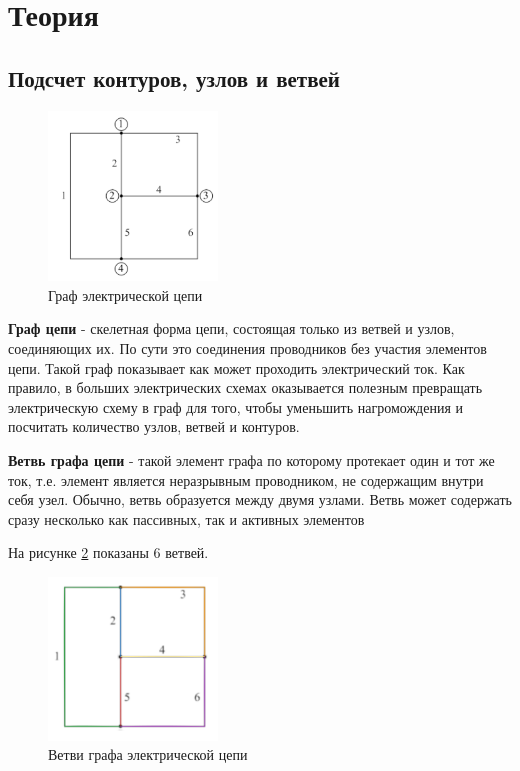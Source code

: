 \section{Теория}
\subsection{Подсчет контуров, узлов  и ветвей}
\begin{figure}[H]
    \centering
    \includegraphics[width=0.4\textwidth]{images/image_1_contures_nodes_branches.png}
    \caption{Граф электрической цепи}
    \label{fig:graph}
\end{figure}

\textbf{Граф цепи} - скелетная форма цепи, состоящая только из ветвей и узлов, соединяющих их. По сути это соединения проводников без участия элементов цепи. Такой граф показывает как может проходить электрический ток. Как правило, в больших электрических схемах оказывается полезным превращать электрическую схему в граф для того, чтобы уменьшить нагромождения и посчитать количество узлов, ветвей и контуров.

\textbf{Ветвь графа цепи} - такой элемент графа по которому протекает один и тот же ток, т.е. элемент является неразрывным проводником, не содержащим внутри себя узел. Обычно, ветвь образуется между двумя узлами. Ветвь может содержать сразу несколько как пассивных, так и активных элементов

На рисунке \ref{fig:graph2} показаны 6 ветвей.

\begin{figure}[H]
    \centering
    \includegraphics[width=0.4\textwidth]{images/image_2_contures_nodes_branches.png}
    \caption{Ветви графа электрической цепи}
    \label{fig:graph2}
\end{figure}

